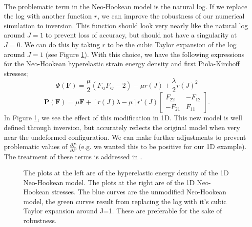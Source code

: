 \documentclass[article]{pcms-l}
\begin{document}
\\
The problematic term in the Neo-Hookean model is the natural log. If we replace the log with another function $r$, we can improve the robustness of our numerical simulation to inversion. This function should look very nearly like the natural log around $J=1$ to prevent loss of accuracy, but should not have a singularity at $J=0$. We can do this by taking $r$ to be the cubic Taylor expansion of the log around $J=1$ (see Figure \ref{inversion3}). With this choice, we have the following expressions for the Neo-Hookean hyperelastic strain energy density and first Piola-Kirchoff stresses;
$$
\Psi(\mathbf{F})=\frac{\mu}{2}(F_{ij}F_{ij}-2)-\mu{r}(J)+\frac{\lambda}{2}r(J)^2
$$
$$
\mathbf{P}(\mathbf{F})=\mu\mathbf{F}+\left[r(J)\lambda-\mu\right]r'(J)\left[\begin{array}{cc}
F_{22} & -F_{12}\\
-F_{21} & F_{11} \end{array}\right].
$$
In Figure \ref{inversion3}, we see the effect of this modification in 1D. This new model is well defined through inversion, but accurately reflects the original model when very near the undeformed configuration. We can make further adjustments to prevent problematic values of $\frac{\partial{P}}{\partial{F}}$ (e.g. we wanted this to be positive for our 1D example). The treatment of these terms is addressed in \cite{TeranQuas05}.
\begin{figure}
\caption{The plots at the left are of the hyperelastic energy density of the 1D Neo-Hookean model. The plots at the right are of the 1D Neo-Hookean stresses. The blue curves are the unmodified Neo-Hookean model, the green curves result from replacing the log with it's cubic Taylor expansion around J=1. These are preferable for the sake of robustness.}
\label{inversion3}
\end{figure}
\end{document}
